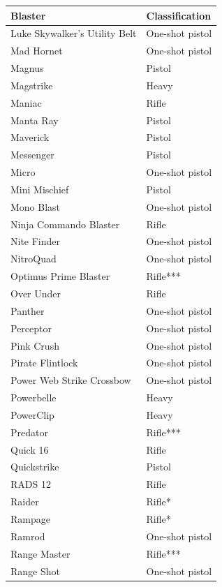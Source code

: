 \begin{table}
\begin{tabular}{|l|l|} \hline 
Blaster & Classification \\
 \hline Luke Skywalker's Utility Belt & One-shot pistol \\
 \hline Mad Hornet & One-shot pistol \\
 \hline Magnus & Pistol \\
 \hline Magstrike & Heavy \\
 \hline Maniac & Rifle \\
 \hline Manta Ray & Pistol \\
 \hline Maverick & Pistol \\
 \hline Messenger & Pistol \\
 \hline Micro & One-shot pistol \\
 \hline Mini Mischief & Pistol \\
 \hline Mono Blast & One-shot pistol \\
 \hline Ninja Commando Blaster & Rifle \\
 \hline Nite Finder & One-shot pistol \\
 \hline NitroQuad & One-shot pistol \\
 \hline Optimus Prime Blaster & Rifle*** \\
 \hline Over Under & Rifle \\
 \hline Panther & One-shot pistol \\
 \hline Perceptor & One-shot pistol \\
 \hline Pink Crush & One-shot pistol \\
 \hline Pirate Flintlock & One-shot pistol \\
 \hline Power Web Strike Crossbow & One-shot pistol \\
 \hline Powerbelle & Heavy \\
 \hline PowerClip & Heavy \\
 \hline Predator & Rifle*** \\
 \hline Quick 16 & Rifle \\
 \hline Quickstrike & Pistol \\
 \hline RADS 12 & Rifle \\
 \hline Raider & Rifle* \\
 \hline Rampage & Rifle* \\
 \hline Ramrod & One-shot pistol \\
 \hline Range Master & Rifle*** \\
 \hline Range Shot & One-shot pistol \\

\end{tabular}
\end{table}
